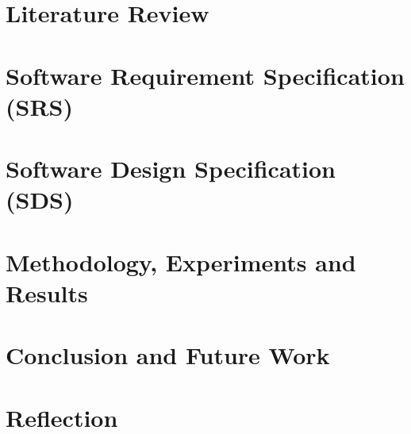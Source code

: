 \documentclass[12pt,twoside]{report}
\begin{document}
\chapter{Literature Review}
\label{chap:lit}


\chapter{Software Requirement Specification (SRS)}
\label{chap:srs}


\chapter{Software Design Specification (SDS)}
\label{chap:sds}


\chapter{Methodology, Experiments and Results}
\label{chap:results}


\chapter{Conclusion and Future Work}
\label{chap:outro}


\chapter{Reflection}
\label{chap:Reflection}



  
% 

% 

% 

\printbibliography[heading=bibintoc,title={References}]
\end{document}

